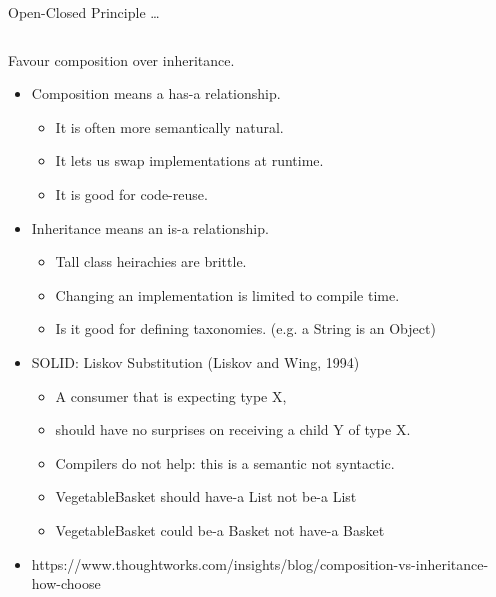 \documentclass{beamer}
\begin{document}
\begin{frame}{Open-Closed Principle \ldots}
    \vspace{0cm}
    \begin{columns}
        \column{\dimexpr\paperwidth-40pt}
        
    \end{columns}
\end{frame}

\begin{frame}{Favour composition over inheritance.}
    \begin{itemize}
        \item Composition means a has-a relationship.
            \begin{itemize}
                \item It is often more semantically natural.
                \item It lets us swap implementations at runtime.
                \item It is good for code-reuse.
            \end{itemize}
        \item Inheritance means an is-a relationship.
            \begin{itemize}
                \item Tall class heirachies are brittle.
                \item Changing an implementation is limited to compile time.
                \item Is it good for defining taxonomies. (e.g. a String is an Object)
            \end{itemize}
        \item SOLID: Liskov Substitution (Liskov and Wing, 1994)
            \begin{itemize}
                \item A consumer that is expecting type X, 
                \item should have no surprises on receiving a child Y of type X.
                \item Compilers do not help: this is a semantic not syntactic.
                \item VegetableBasket should have-a List not be-a List
                \item VegetableBasket could be-a Basket not have-a Basket
            \end{itemize}
        \item https://www.thoughtworks.com/insights/blog/composition-vs-inheritance-how-choose
    \end{itemize}
\end{frame}
\end{document}
